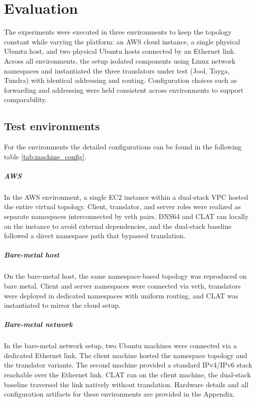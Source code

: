 \chapter{Evaluation}
The experiments were executed in three environments to keep the topology constant while varying the platform: an AWS cloud instance, a single physical Ubuntu host, and two physical Ubuntu hosts connected by an Ethernet link. Across all environments, the setup isolated components using Linux network namespaces and instantiated the three translators under test (Jool, Tayga, Tundra) with identical addressing and routing. Configuration choices such as forwarding and addressing were held consistent across environments to support comparability. 

\section{Test environments}
For the environments the detailed configurations can be found in the following table \ref{tab:machine_config}.
\paragraph{AWS}
In the AWS environment, a single EC2 instance within a dual-stack VPC hosted the entire virtual topology. Client, translator, and server roles were realized as separate namespaces interconnected by veth pairs\cite{veth4}. DNS64 and CLAT ran locally on the instance to avoid external dependencies, and the dual-stack baseline followed a direct namespace path that bypassed translation.

\paragraph{Bare-metal host}
On the bare-metal host, the same namespace-based topology was reproduced on bare metal. Client and server namespaces were connected via veth, translators were deployed in dedicated namespaces with uniform routing, and CLAT was instantiated to mirror the cloud setup. 
\paragraph{Bare-metal network}
In the bare-metal network setup, two Ubuntu machines were connected via a dedicated Ethernet link. The client machine hosted the namespace topology and the translator variants. The second machine provided a standard IPv4/IPv6 stack reachable over the Ethernet link. CLAT ran on the client machine, the dual-stack baseline traversed the link natively without translation. Hardware details and all configuration artifacts for these environments are provided in the Appendix.


